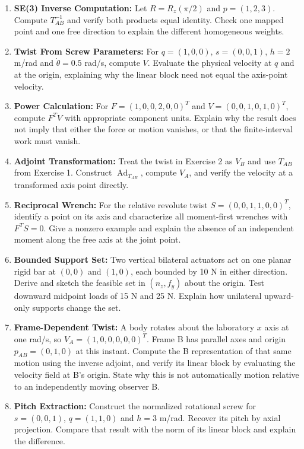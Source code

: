 \begin{enumerate}
\item \textbf{SE(3) Inverse Computation:} Let $R=R_z(\pi/2)$ and $p=(1,2,3)$. Compute $T_{AB}^{-1}$ and verify both products equal identity. Check one mapped point and one free direction to explain the different homogeneous weights.
\item \textbf{Twist From Screw Parameters:} For $q=(1,0,0)$, $s=(0,0,1)$, $h=2$ m/rad and $\dot\theta=0.5$ rad/s, compute $V$. Evaluate the physical velocity at $q$ and at the origin, explaining why the linear block need not equal the axis-point velocity.
\item \textbf{Power Calculation:} For $F=(1,0,0,2,0,0)^T$ and $V=(0,0,1,0,1,0)^T$, compute $F^TV$ with appropriate component units. Explain why the result does not imply that either the force or motion vanishes, or that the finite-interval work must vanish.
\item \textbf{Adjoint Transformation:} Treat the twist in Exercise 2 as $V_B$ and use $T_{AB}$ from Exercise 1. Construct $\operatorname{Ad}_{T_{AB}}$, compute $V_A$, and verify the velocity at a transformed axis point directly.
\item \textbf{Reciprocal Wrench:} For the relative revolute twist $S=(0,0,1,1,0,0)^T$, identify a point on its axis and characterize all moment-first wrenches with $F^TS=0$. Give a nonzero example and explain the absence of an independent moment along the free axis at the joint point.
\item \textbf{Bounded Support Set:} Two vertical bilateral actuators act on one planar rigid bar at $(0,0)$ and $(1,0)$, each bounded by 10 N in either direction. Derive and sketch the feasible set in $(n_z,f_y)$ about the origin. Test downward midpoint loads of 15 N and 25 N. Explain how unilateral upward-only supports change the set.
\item \textbf{Frame-Dependent Twist:} A body rotates about the laboratory $x$ axis at one rad/s, so $V_A=(1,0,0,0,0,0)^T$. Frame B has parallel axes and origin $p_{AB}=(0,1,0)$ at this instant. Compute the B representation of that same motion using the inverse adjoint, and verify its linear block by evaluating the velocity field at B's origin. State why this is not automatically motion relative to an independently moving observer B.
\item \textbf{Pitch Extraction:} Construct the normalized rotational screw for $s=(0,0,1)$, $q=(1,1,0)$ and $h=3$ m/rad. Recover its pitch by axial projection. Compare that result with the norm of its linear block and explain the difference.

\end{enumerate}
